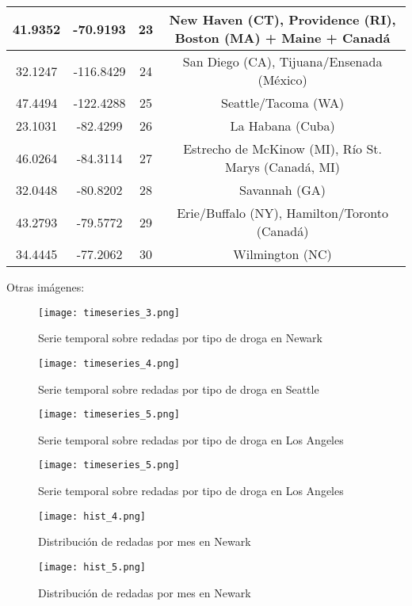 \documentclass[12pt]{article}
\begin{document}
\begin{table}[H]
\begin{tabular}{|c|c|c|c|}
		\hline
		41.9352 & -70.9193 & 23  & New Haven (CT), Providence (RI), Boston (MA) + Maine + Canadá \\
		\hline
		32.1247 & -116.8429 & 24  & San Diego (CA), Tijuana/Ensenada (México) \\
		\hline
		47.4494 & -122.4288 & 25  & Seattle/Tacoma (WA) \\
		\hline
		23.1031 & -82.4299 & 26  & La Habana (Cuba) \\
		\hline
		46.0264 & -84.3114 & 27  & Estrecho de McKinow (MI), Río St. Marys (Canadá, MI) \\
		\hline
		32.0448 & -80.8202 & 28  & Savannah (GA) \\
		\hline
		43.2793 & -79.5772 & 29  & Erie/Buffalo (NY), Hamilton/Toronto (Canadá) \\
		\hline
		34.4445 & -77.2062 & 30  & Wilmington (NC) \\
		\hline
	\end{tabular}
\end{table}


Otras imágenes:

\begin{figure}[H]
	\caption{\label{timeseries_3} Serie temporal sobre redadas por tipo de droga en Newark}
	\centering
	\hspace*{1cm}
	\texttt{[image: timeseries\_3.png]}
\end{figure}

\begin{figure}[H]
	\caption{\label{timeseries_4} Serie temporal sobre redadas por tipo de droga en Seattle}
	\centering
	\hspace*{1cm}
	\texttt{[image: timeseries\_4.png]}
\end{figure}

\begin{figure}[H]
	\caption{\label{timeseries_5} Serie temporal sobre redadas por tipo de droga en Los Angeles}
	\centering
	\hspace*{1cm}
	\texttt{[image: timeseries\_5.png]}
\end{figure}

\begin{figure}[H]
	\caption{\label{timeseries_5} Serie temporal sobre redadas por tipo de droga en Los Angeles}
	\centering
	\hspace*{1cm}
	\texttt{[image: timeseries\_5.png]}
\end{figure}

\begin{figure}[H]
	\caption{\label{hist_4} Distribución de redadas por mes en Newark}
	\centering
	\hspace*{1cm}
	\texttt{[image: hist\_4.png]}
\end{figure}

\begin{figure}[H]
 	\caption{\label{hist_5} Distribución de redadas por mes en Newark}
 	\centering
 	\hspace*{1cm}
 	\texttt{[image: hist\_5.png]}
\end{figure}
\end{document}
